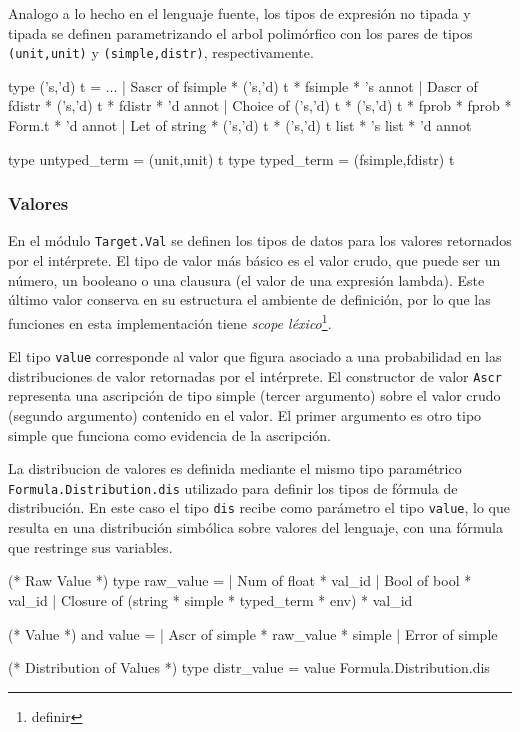 Analogo a lo hecho en el lenguaje fuente, los tipos de expresión no tipada y
tipada se definen parametrizando el arbol polimórfico con los pares de tipos
\verb|(unit,unit)| y \verb|(simple,distr)|, respectivamente.

\begin{ocamlblock}[caption={AST destino (extracto)}, label={lst:trgt-ast}]
  type ('s,'d) t =
  ...
| Sascr        of fsimple * ('s,'d) t * fsimple * 's annot
| Dascr        of fdistr  * ('s,'d) t * fdistr  * 'd annot
| Choice       of ('s,'d) t * ('s,'d) t * fprob * fprob * Form.t * 'd annot
| Let          of string  * ('s,'d) t * ('s,'d) t list * 's list * 'd annot

type untyped_term = (unit,unit) t
type typed_term   = (fsimple,fdistr) t
\end{ocamlblock}

\subsubsection{Valores}

En el módulo \verb|Target.Val| se definen los tipos de datos para los
valores retornados por el intérprete. El tipo de valor más básico es
el valor crudo, que puede ser un número, un booleano o una clausura (el
valor de una expresión lambda). Este último valor conserva en su
estructura el ambiente de definición, por lo que las funciones en esta
implementación tiene \emph{scope léxico}\footnote{definir}.

El tipo \verb|value| corresponde al valor que figura asociado a una
probabilidad en las distribuciones de valor retornadas por el
intérprete. El constructor de valor \verb|Ascr| representa una
ascripción de tipo simple (tercer argumento) sobre el valor crudo
(segundo argumento) contenido en el valor. El primer argumento es otro tipo
simple que funciona como evidencia de la ascripción.

La distribucion de valores es definida mediante el mismo tipo
paramétrico \verb|Formula.Distribution.dis| utilizado para definir los
tipos de fórmula de distribución. En este caso el tipo \verb|dis|
recibe como parámetro el tipo \verb|value|, lo que resulta en una
distribución simbólica sobre valores del lenguaje, con una fórmula que
restringe sus variables.

\begin{ocamlblock}[caption={Valor Crudo, Valor, y Distribucion de Valores}, label={lst:val}]
  (* Raw Value *)
  type raw_value = 
  | Num of float * val_id 
  | Bool of bool * val_id
  | Closure of (string * simple * typed_term * env) * val_id

  (* Value *)
  and value = 
  | Ascr of simple * raw_value * simple 
  | Error of simple
  
  (* Distribution of Values *)
  type distr_value = value Formula.Distribution.dis
\end{ocamlblock}

